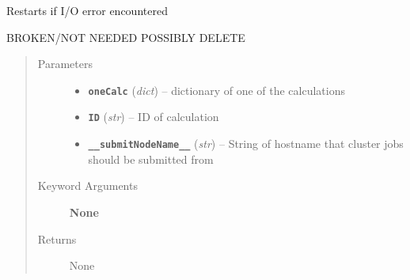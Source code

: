 \documentclass[letterpaper,10pt,english]{sphinxmanual}
\begin{document}
\begin{fulllineitems}
\label{run:run.__io_error_restart}
Restarts if I/O error encountered

BROKEN/NOT NEEDED POSSIBLY DELETE
\begin{quote}\begin{description}
\item[{Parameters}] \leavevmode\begin{itemize}
\item {} 
\textbf{\texttt{oneCalc}} (\emph{dict}) -- dictionary of one of the calculations

\item {} 
\textbf{\texttt{ID}} (\emph{str}) -- ID of calculation

\item {} 
\textbf{\texttt{\_\_submitNodeName\_\_}} (\emph{str}) -- String of hostname that cluster jobs should be submitted from

\end{itemize}

\item[{Keyword Arguments}] \leavevmode
\textbf{None}

\item[{Returns}] \leavevmode
None

\end{description}\end{quote}

\end{fulllineitems}

\end{document}

